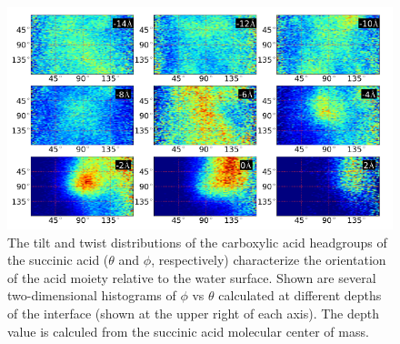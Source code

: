 \begin{figure}[h!]
	\begin{center}
		\includegraphics[scale=1.0]{images/bond-angles/carbonyl-theta-phi.png}
		\caption{The tilt and twist distributions of the carboxylic acid headgroups of the succinic acid ($\theta$ and $\phi$, respectively) characterize the orientation of the acid moiety relative to the water surface. Shown are several two-dimensional histograms of $\phi$ vs $\theta$ calculated at different depths of the interface (shown at the upper right of each axis). The depth value is calculed from the succinic acid molecular center of mass.} 
		\label{fig:carbonyl-theta-phi}
	\end{center}
\end{figure}



